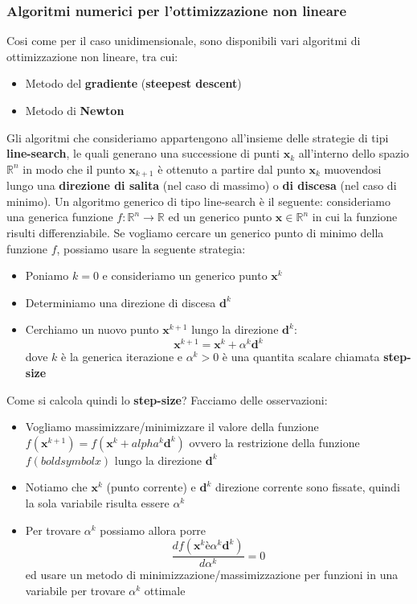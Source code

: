 \documentclass[12pt]{article}
\begin{document}
\subsubsection{Algoritmi numerici per l'ottimizzazione non lineare}
Cosi come per il caso unidimensionale, sono disponibili vari algoritmi di ottimizzazione non lineare, tra cui:
\begin{itemize}
    \item Metodo del \textbf{gradiente} (\textbf{steepest descent})
    \item Metodo di \textbf{Newton}
\end{itemize}
Gli algoritmi che consideriamo appartengono all'insieme delle strategie di tipi \textbf{line-search}, le quali generano una successione di punti $\boldsymbol{x}_k$ all'interno dello spazio $\mathbb{R}^n$ in modo che il punto $\boldsymbol{x}_{k+1}$ è ottenuto a partire
dal punto $\boldsymbol{x}_k$ muovendosi lungo una \textbf{direzione di salita} (nel caso di massimo) o \textbf{di discesa} (nel caso di minimo).
Un algoritmo generico di tipo line-search è il seguente: consideriamo una generica funzione $f:\mathbb{R}^n \rightarrow \mathbb{R}$ ed un generico punto $\boldsymbol{x} \in \mathbb{R}^n$ in cui la funzione risulti differenziabile.
Se vogliamo cercare un generico punto di minimo della funzione $f$, possiamo usare la seguente strategia:
\begin{itemize}
    \item Poniamo $k = 0$ e consideriamo un generico punto $\boldsymbol{x}^k$
    \item Determiniamo una direzione di discesa $\boldsymbol{d}^k$
    \item Cerchiamo un nuovo punto $\boldsymbol{x}^{k+1}$ lungo la direzione $\boldsymbol{d}^k$: $$\boldsymbol{x}^{k+1} = \boldsymbol{x}^k + \alpha^k \boldsymbol{d}^k$$
    dove $k$ è la generica iterazione e $\alpha^k > 0$ è una quantita scalare chiamata \textbf{step-size}
\end{itemize}
Come si calcola quindi lo \textbf{step-size}? Facciamo delle osservazioni:
\begin{itemize}
    \item Vogliamo massimizzare/minimizzare il valore della funzione $f(\boldsymbol{x}^{k+1}) = f(\boldsymbol{x}^k + alpha^k\boldsymbol{d}^k)$ ovvero la restrizione della funzione $f(boldsymbol{x})$ lungo la direzione $\boldsymbol{d}^k$
    \item Notiamo che $\boldsymbol{x}^k$ (punto corrente) e $\boldsymbol{d}^k$ direzione corrente sono fissate, quindi la sola variabile risulta essere $\alpha^k$
    \item Per trovare $\alpha^k$ possiamo allora porre
    $$\frac{d f(\boldsymbol{x}^k è \alpha^k \boldsymbol{d}^k)}{d \alpha^k} = 0$$
    ed usare un metodo di minimizzazione/massimizzazione per funzioni in una variabile per trovare $\alpha^k$ ottimale
\end{itemize}
\end{document}
